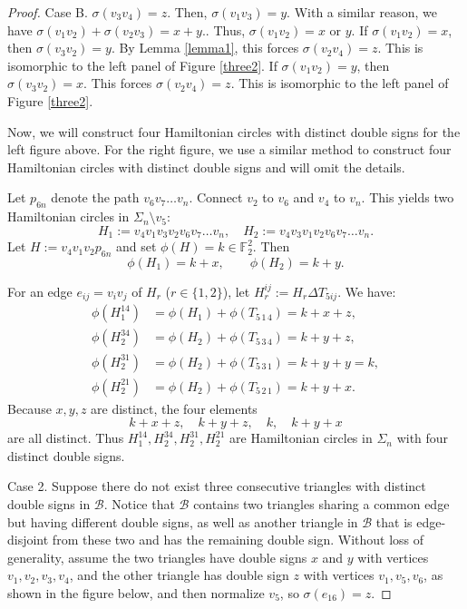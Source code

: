 \documentclass[12pt]{amsart}
\theoremstyle{plain}
\theoremstyle{definition}%
\begin{document}
\begin{proof}
Case B. $\sigma(v_3v_4)=z$. Then, $\sigma(v_1v_3)=y$. With a similar reason, we have $\sigma(v_1v_2)+\sigma(v_2v_3)=x+y.$.  
Thus, $\sigma(v_1v_2)=x$ or $y$. If $\sigma(v_1v_2)=x$, then $\sigma(v_3v_2)=y$.   By Lemma \ref{lemma1}, this forces $\sigma(v_2v_4)=z$. This is isomorphic to the left panel of Figure \ref{three2}.      If $\sigma(v_1v_2)=y$, then $\sigma(v_3v_2)=x$.  This forces $\sigma(v_2v_4)=z$. This is isomorphic to the left panel of Figure \ref{three2}.

\vspace{0.5cm}


Now, we will construct four Hamiltonian circles with distinct double signs for the left figure above.  
For the right figure, we use a similar method to construct four Hamiltonian circles with distinct double signs and will omit the details.  

Let \(p_{6n}\) denote the path \(v_6 v_7 \ldots v_n\).  Connect \(v_2\) to \(v_6\) and \(v_4\) to \(v_n\).  
This yields two Hamiltonian circles in \(\Sigma_n \setminus v_5\):  
\[
H_1 := v_4 v_1 v_3 v_2 v_6 v_7 \ldots v_n, 
\quad 
H_2 := v_4 v_3 v_1 v_2 v_6 v_7 \ldots v_n.
\]
Let $H := v_4 v_1 v_2 p_{6n}$ and set $\phi(H) = k \in \mathbb{F}_2^2$. 
Then
\[
\phi(H_1) = k + x, \qquad \phi(H_2) = k + y.
\]

For an edge $e_{ij} = v_i v_j$ of $H_r$ ($r \in \{1,2\}$), let $H_r^{ij} := H_r \Delta T_{5ij}$.
We have:
\begin{align*}
\phi(H_{1}^{14}) &= \phi(H_1) + \phi(T_{5\,1\,4}) = k + x + z,\\
\phi(H_{2}^{34}) &= \phi(H_2) + \phi(T_{5\,3\,4}) = k + y + z,\\
\phi(H_{2}^{31}) &= \phi(H_2) + \phi(T_{5\,3\,1}) = k + y + y = k,\\
\phi(H_{2}^{21}) &= \phi(H_2) + \phi(T_{5\,2\,1}) = k + y + x.
\end{align*}
Because $x,y,z$ are distinct, the four elements 
\[
k+x+z,\quad k+y+z,\quad k,\quad k+y+x
\]
are all distinct. 
Thus $H_{1}^{14}, H_{2}^{34}, H_{2}^{31}, H_{2}^{21}$ are Hamiltonian circles in $\Sigma_n$ with four distinct double signs.


Case 2. Suppose there do not exist three consecutive triangles with distinct double signs in \(\mathcal{B}\).   
Notice that $\mathcal{B}$ contains two triangles sharing a common edge but having different double signs, as well as another triangle in $\mathcal{B}$ that is edge-disjoint from these two and has the remaining double sign.
  Without loss of generality, assume the two triangles have double signs \(x\) and \(y\) with vertices \(v_1, v_2, v_3, v_4\), and the other triangle has double sign \(z\) with vertices \(v_1, v_5, v_6\), as shown in the figure below, and then  normalize \(v_5\), so $\sigma(e_{16})=z$.  


\end{proof}
\end{document}
